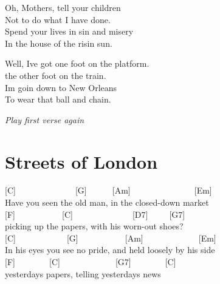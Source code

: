\documentclass[
  letterpaper,
  a5paper]{memoir}
\begin{document}
Oh, Mothers, tell your children\\
Not to do what I have done.\\
Spend your lives in sin and misery\\
In the house of the risin\textquotesingle{} sun.

Well, I\textquotesingle ve got one foot on the platform.\\
the other foot on the train.\\
I\textquotesingle m goin\textquotesingle{} down to New Orleans\\
To wear that ball and chain.

\emph{Play first verse again}

\hypertarget{streets-of-london}{%
\chapter{Streets of London}\label{streets-of-london}}

{[}C{]}~~~~~~~~~~~~~~{[}G{]}~~~~~~{[}Am{]}~~~~~~~~~~~~~~~{[}Em{]}\\
Have you seen the old man, in the closed-down market\\
{[}F{]}~~~~~~~~~~~{[}C{]}~~~~~~~~~~~~~~{[}D7{]}~~~~~{[}G7{]}\\
picking up the papers, with his worn-out shoes?\\
{[}C{]}~~~~~~~~~~~~{[}G{]}~~~~~~~~~~~{[}Am{]}~~~~~~~~~~~~~{[}Em{]}\\
In his eyes you see no pride, and held loosely by his side\\
{[}F{]}~~~~~~~~{[}C{]}~~~~~~~~~~~~~{[}G7{]}~~~~~~~~{[}C{]}\\
yesterday\textquotesingle s papers, telling yesterday\textquotesingle s
news
\end{document}
